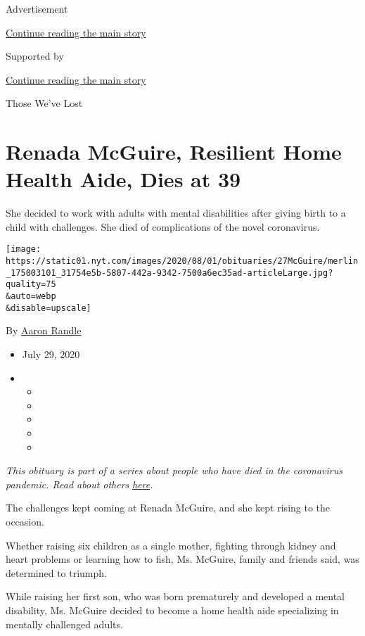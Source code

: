 Advertisement

\protect\hyperlink{after-top}{Continue reading the main story}

Supported by

\protect\hyperlink{after-sponsor}{Continue reading the main story}

Those We've Lost

\hypertarget{renada-mcguire-resilient-home-health-aide-dies-at-39}{%
\section{Renada McGuire, Resilient Home Health Aide, Dies at
39}\label{renada-mcguire-resilient-home-health-aide-dies-at-39}}

She decided to work with adults with mental disabilities after giving
birth to a child with challenges. She died of complications of the novel
coronavirus.

\texttt{[image: https://static01.nyt.com/images/2020/08/01/obituaries/27McGuire/merlin\_175003101\_31754e5b-5807-442a-9342-7500a6ec35ad-articleLarge.jpg?quality=75\\\&auto=webp\\\&disable=upscale]}

By \href{https://www.nytimes.com/by/aaron-randle}{Aaron Randle}

\begin{itemize}
\item
  July 29, 2020
\item
  \begin{itemize}
  \item
  \item
  \item
  \item
  \item
  \end{itemize}
\end{itemize}

\emph{This obituary is part of a series about people who have died in
the coronavirus pandemic. Read about others}
\href{https://www.nytimes.com/interactive/2020/obituaries/people-died-coronavirus-obituaries.html}{\emph{here}}\emph{.}

The challenges kept coming at Renada McGuire, and she kept rising to the
occasion.

Whether raising six children as a single mother, fighting through kidney
and heart problems or learning how to fish, Ms. McGuire, family and
friends said, was determined to triumph.

While raising her first son, who was born prematurely and developed a
mental disability, Ms. McGuire decided to become a home health aide
specializing in mentally challenged adults.

